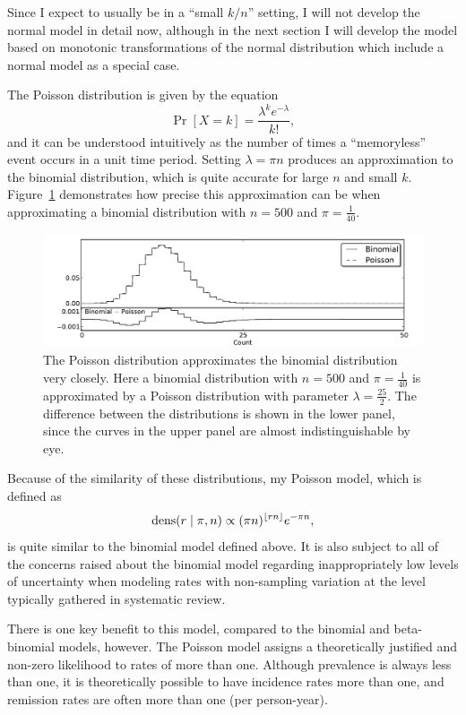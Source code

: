 Since I expect to usually be in a ``small $k/n$'' setting, I will not
develop the normal model in detail now, although in the next section I
will develop the model based on monotonic transformations of the
normal distribution which include a normal model as a special case.

The Poisson distribution is given by the equation
\[
\Pr[X=k] =
\frac{\lambda^k e^{-\lambda}}{k!},
\]
and it can be understood intuitively as the number of times a
``memoryless'' event occurs in a unit time period.  Setting $\lambda
=\pi n$ produces an approximation to the binomial distribution, which
is quite accurate for large $n$ and small
$k$. Figure~\ref{rate-model-poisson-approx-to-binom} demonstrates how
precise this approximation can be when approximating a binomial
distribution with $n=500$ and $\pi=\frac{1}{40}$.

\begin{figure}[h]
\begin{center}
\includegraphics[width=\textwidth]{poisson_approx_to_binom.pdf}
\end{center}
\caption{The Poisson distribution approximates the binomial
  distribution very closely. Here a binomial distribution with $n=500$
  and $\pi=\frac{1}{40}$ is approximated by a Poisson distribution
  with parameter $\lambda=\frac{25}{2}$.  The difference between the
  distributions is shown in the lower panel, since the curves in the
  upper panel are almost indistinguishable by eye.}
\label{rate-model-poisson-approx-to-binom}
\end{figure}

Because of the similarity of these distributions, my Poisson model,
which is defined as
\[
\operatorname{dens}(r\;|\; \pi,n) \propto (\pi n)^{\lfloor
  rn\rfloor} e^{-\pi n},
\]
is quite similar to the binomial model defined above.  It is also
subject to all of the concerns raised about the binomial model
regarding inappropriately low levels of uncertainty when modeling
rates with non-sampling variation at the level typically gathered in
systematic review.

There is one key benefit to this model, compared to the binomial and
beta-binomial models, however.  The Poisson model assigns a
theoretically justified and non-zero likelihood to rates of more than
one.  Although prevalence is always less than one, it is theoretically
possible to have incidence rates more than one, and remission rates
are often more than one (per person-year).


